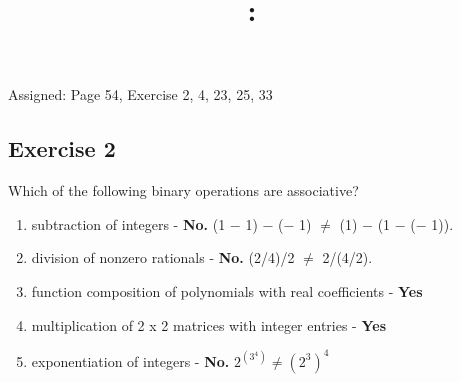 \documentclass{article}
\title{
    \vspace{2in}
    \textmd{\textbf{\hmwkClass:\ \hmwkTitle}}\\
    \normalsize\vspace{0.1in}\small\vspace{0.1in}\large{\textit{\hmwkClassInstructor}}
    \vspace{3in}
}
\author{\hmwkAuthorName}
\date{}
\newcommand{\mt}[1]{\ensuremath{#1}}
\newcommand\ssc[2][\DefaultOpt]{%
  \def\DefaultOpt{#2}%
  \subsection[#1]{#2}%
}
\newcommand{\balist}{\begin{enumerate}[label=\alph*.]}
\newcommand{\elist}{\end{enumerate}}
\newcommand{\ms}{\mt{-} }
\begin{document}
Assigned: Page 54, Exercise 2, 4, 23, 25, 33

\ssc{Exercise 2}{

Which of the following binary operations are associative?
\balist
\item subtraction of integers - \textbf{No.} (1 \ms 1) \ms (\ms 1) $\neq$ (1) \ms (1 \ms (\ms 1)). 
\item division of nonzero rationals - \textbf{No.} (2/4)/2 $\neq$ 2/(4/2). 

\item function composition of polynomials with real coefficients - \textbf{Yes}
\item multiplication of 2 x 2 matrices with integer entries - \textbf{Yes}
\item exponentiation of integers - \textbf{No.} \mt{2^{(3^4)} \neq (2^3)^4}
\elist

}
\end{document}
